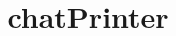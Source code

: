 \documentclass[10pt, twoside, a4paper]{article}
\title{chatPrinter}
\begin{document}
	\begin{multicols}{2}
		\thispagestyle{plain}
		\tableofcontents
		\clearpage		
		
	\end{multicols}
\end{document}
